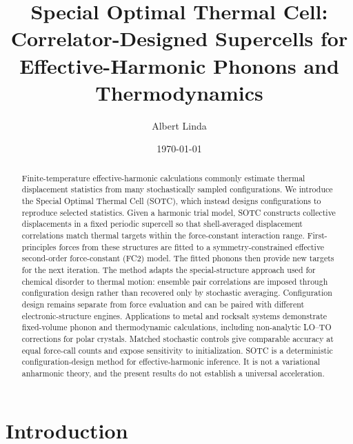 \documentclass[aps,prb,reprint,amsmath,amssymb,floatfix]{revtex4-2}
\begin{document}
\title{Special Optimal Thermal Cell: Correlator-Designed Supercells for Effective-Harmonic Phonons and Thermodynamics}

\author{Albert Linda}

\date{\today}

\begin{abstract}

\color{revisionblue}
Finite-temperature effective-harmonic calculations commonly estimate thermal
displacement statistics from many stochastically sampled configurations. We
introduce the Special Optimal Thermal Cell (SOTC), which instead designs
configurations to reproduce selected statistics. Given a harmonic trial model,
SOTC constructs collective displacements in a fixed periodic supercell so that
shell-averaged displacement correlations match thermal targets within the
force-constant interaction range. First-principles forces from these structures
are fitted to a symmetry-constrained effective second-order force-constant
(FC2) model. The fitted phonons then provide new targets for the next iteration.
The method adapts the special-structure approach used for chemical disorder to
thermal motion: ensemble pair correlations are imposed through configuration
design rather than recovered only by stochastic averaging. Configuration design
remains separate from force evaluation and can be paired with different
electronic-structure engines. Applications to metal and rocksalt systems
demonstrate fixed-volume phonon and thermodynamic calculations, including
non-analytic LO--TO corrections for polar crystals. Matched stochastic controls
give comparable accuracy at equal force-call counts and expose sensitivity to
initialization. SOTC is a deterministic configuration-design method for
effective-harmonic inference. It is not a variational anharmonic theory, and
the present results do not establish a universal acceleration.
\color{black}

\end{abstract}

\maketitle

\section{Introduction}\label{introduction}
\end{document}
